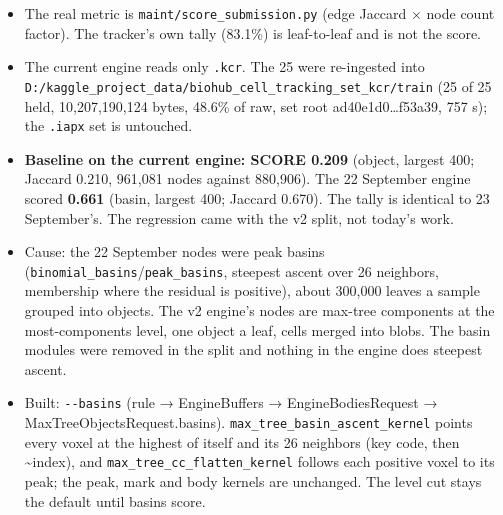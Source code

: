 \begin{enumerate}
\begin{itemize}
\item The real metric is \texttt{maint/\allowbreak{}score\_\allowbreak{}submission.\allowbreak{}py} (edge Jaccard × node count factor). The tracker's own tally (83.1\%) is leaf-to-leaf and is not the score.
\item The current engine reads only \texttt{.\allowbreak{}kcr}. The 25 were re-ingested into \texttt{D:/\allowbreak{}kaggle\_\allowbreak{}project\_\allowbreak{}data/\allowbreak{}biohub\_\allowbreak{}cell\_\allowbreak{}tracking\_\allowbreak{}set\_\allowbreak{}kcr/\allowbreak{}train} (25 of 25 held, 10,207,190,124 bytes, 48.6\% of raw, set root ad40e1d0…f53a39, 757 s); the \texttt{.\allowbreak{}iapx} set is untouched.
\item \textbf{Baseline on the current engine: SCORE 0.209} (object, largest 400; Jaccard 0.210, 961,081 nodes against 880,906). The 22 September engine scored \textbf{0.661} (basin, largest 400; Jaccard 0.670). The tally is identical to 23 September's. The regression came with the v2 split, not today's work.
\item Cause: the 22 September nodes were peak basins (\texttt{binomial\_\allowbreak{}basins}/\texttt{peak\_\allowbreak{}basins}, steepest ascent over 26 neighbors, membership where the residual is positive), about 300,000 leaves a sample grouped into objects. The v2 engine's nodes are max-tree components at the most-components level, one object a leaf, cells merged into blobs. The basin modules were removed in the split and nothing in the engine does steepest ascent.
\item Built: \texttt{-\allowbreak{}-\allowbreak{}basins} (rule → EngineBuffers → EngineBodiesRequest → MaxTreeObjectsRequest.basins). \texttt{max\_\allowbreak{}tree\_\allowbreak{}basin\_\allowbreak{}ascent\_\allowbreak{}kernel} points every voxel at the highest of itself and its 26 neighbors (key code, then \textasciitilde{}index), and \texttt{max\_\allowbreak{}tree\_\allowbreak{}cc\_\allowbreak{}flatten\_\allowbreak{}kernel} follows each positive voxel to its peak; the peak, mark and body kernels are unchanged. The level cut stays the default until basins score.
\end{itemize}
\end{enumerate}
